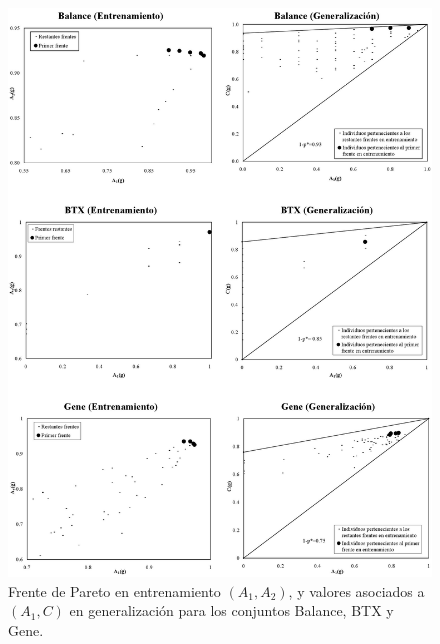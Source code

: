 \begin{figure}[!htb]
\centering
	\includegraphics[keepaspectratio,width=13cm]{figuras/tanda4.jpg}
	\caption{Frente de Pareto en entrenamiento $(A_{1},A_{2})$, y valores asociados
a $(A_{1},C)$ en generalización para los conjuntos Balance, BTX y Gene.}
\label{tanda4}
\end{figure}

